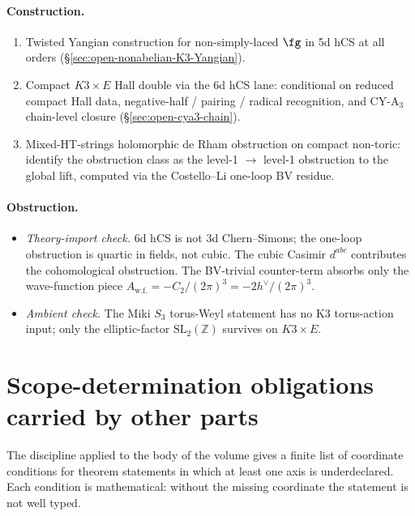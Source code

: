 \paragraph{Construction.}
\begin{enumerate}[nosep]
\item Twisted Yangian construction for non-simply-laced $\fg$ in 5d
  hCS at all orders (\S\ref{sec:open-nonabelian-K3-Yangian}).
\item Compact $K3 \times E$ Hall double via the 6d hCS lane: conditional on
  reduced compact Hall data, negative-half / pairing / radical
  recognition, and CY-A$_3$ chain-level closure
  (\S\ref{sec:open-cya3-chain}).
\item Mixed-HT-strings holomorphic de Rham obstruction on compact
  non-toric: identify the obstruction class as the level-1 $\to$ level-1
  obstruction to the global lift, computed via the
  Costello--Li one-loop BV residue.
\end{enumerate}

\paragraph{Obstruction.}
\begin{itemize}[nosep]
\item \emph{Theory-import check.} 6d hCS is not 3d Chern--Simons; the
  one-loop obstruction is quartic in fields, not cubic. The cubic Casimir
  $d^{abc}$ contributes the cohomological obstruction. The BV-trivial
  counter-term absorbs only the wave-function piece
  $A_{\mathrm{w.f.}} = -C_2 / (2\pi)^3 = -2 h^\vee / (2\pi)^3$.
\item \emph{Ambient check.} The Miki $S_3$ torus-Weyl statement has no
  K3 torus-action input; only the elliptic-factor $\mathrm{SL}_2(\mathbb{Z})$
  survives on $K3 \times E$.
\end{itemize}

\section{Scope-determination obligations carried by other parts}
\label{sec:open-scope-obligations}

The discipline applied to the body of the volume gives a finite list of
coordinate conditions for theorem statements in which at least one axis is
underdeclared. Each condition is mathematical: without the missing
coordinate the statement is not well typed.


